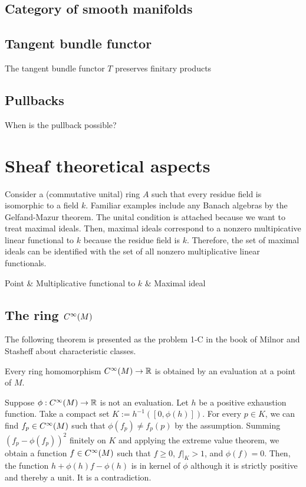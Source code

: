 \documentclass{../exp}
\begin{document}
\subsection{Category of smooth manifolds}


\subsection{Tangent bundle functor}

\begin{thm}
The tangent bundle functor $T$ preserves finitary products
\end{thm}


\subsection{Pullbacks}
When is the pullback possible?








\section{Sheaf theoretical aspects}
Consider a (commutative unital) ring $A$ such that every residue field is isomorphic to a field $k$.
Familiar examples include any Banach algebras by the Gelfand-Mazur theorem.
The unital condition is attached because we want to treat maximal ideals.
Then, maximal ideals correspond to a nonzero multipicative linear functional to $k$ because the residue field is $k$.
Therefore, the set of maximal ideals can be identified with the set of all nonzero multiplicative linear functionals.


\begin{rd}
Point  & Multiplicative functional to $k$  & Maximal ideal 
\end{rd}

\subsection{The ring $C^\infty(M)$}
The following theorem is presented as the problem 1-C in the book of Milnor and Stasheff about characteristic classes.
\begin{thm}
Every ring homomorphism $C^\oo(M)\to\R$ is obtained by an evaluation at a point of $M$.
\end{thm}
\begin{pf}
Suppose $\phi:C^\oo(M)\to\R$ is not an evaluation.
Let $h$ be a positive exhaustion function.
Take a compact set $K:=h^{-1}([0,\phi(h)])$.
For every $p\in K$, we can find $f_p\in C^\infty(M)$ such that $\phi(f_p)\ne f_p(p)$ by the assumption.
Summing $(f_p-\phi(f_p))^2$ finitely on $K$ and applying the extreme value theorem, we obtain a function $f\in C^\infty(M)$ such that $f\ge0$, $f|_K>1$, and $\phi(f)=0$.
Then, the function $h+\phi(h)f-\phi(h)$ is in kernel of $\phi$ although it is strictly positive and thereby a unit.
It is a contradiction.
\end{pf}
\end{document}
